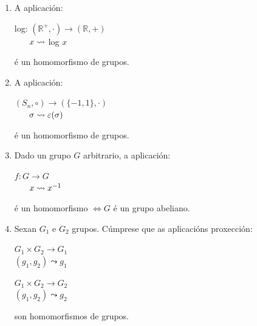 \documentclass[twoside]{report}
\theoremstyle{mystyle}
\begin{document}
\begin{enumerate}
    \vspace{2mm}
    
    \item A aplicación:
    
    \begin{center}
        log: $(\mathbb{R}^{+}, \cdot)  \longrightarrow (\mathbb{R}, +) $\\
        \vspace{2mm}
        $\hspace{6mm} x \leadsto$ log $x$
    \end{center} 
    
    é un homomorfismo de grupos.
    
    \vspace{2mm}
    
    \item A aplicación: %
    
    \begin{center}
        $(S_{n}, \circ) \longrightarrow (\{-1,1\}, \cdot)$ \\
        \vspace{2mm}
        $\hspace{6mm} \sigma \leadsto \varepsilon(\sigma)$
    \end{center} 
    
    é un homomorfismo de grupos.
    
    \vspace{2mm}
    
    \item Dado un grupo $G$ arbitrario, a aplicación:
    
    \begin{center}
        $f: G \longrightarrow G$ \\
        \vspace{2mm}
        $\hspace{6mm} x \leadsto x^{-1}$
    \end{center} 
    
    é un homomorfismo $\Longleftrightarrow G$ é un grupo abeliano. 
    
    \item Sexan $G_{1}$ e $G_{2}$ grupos. Cúmprese que as aplicacións proxección:
    
    \begin{center}
        $G_{1} \times G_{2} \longrightarrow G_{1}$ \\
        \vspace{2mm}
        $(g_{1}, g_{2}) \leadsto g_{1}$
    \end{center} 
    
    \begin{center}
        $G_{1} \times G_{2} \longrightarrow G_{2}$ \\
        \vspace{2mm}
        $(g_{1}, g_{2}) \leadsto g_{2}$
    \end{center} 
    
    son homomorfismos de grupos.
    
\end{enumerate}
\end{document}
